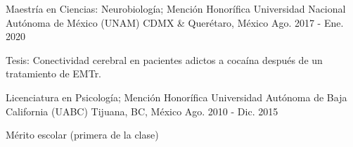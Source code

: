 \begin{cventries}
    \cventry
        {Maestría en Ciencias: Neurobiología; Mención Honorífica}
        {Universidad Nacional Autónoma de México (UNAM)}
        {CDMX \& Querétaro, México}
        {Ago. 2017 - Ene. 2020}
        {
            \begin{cvitems}
                \item {Tesis: Conectividad cerebral en pacientes adictos a cocaína después de un tratamiento de EMTr.}
            \end{cvitems}
        }
    \cventry
        {Licenciatura en Psicología; Mención Honorífica}
        {Universidad Autónoma de Baja California (UABC)}
        {Tijuana, BC, México}
        {Ago. 2010 - Dic. 2015}
        {
            \begin{cvitems}
                \item {Mérito escolar (primera de la clase)}
            \end{cvitems}
        }
\end{cventries}
